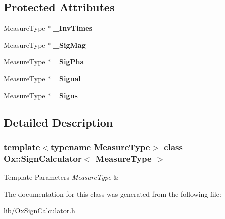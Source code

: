 \subsection*{Protected Attributes}
\begin{DoxyCompactItemize}
\item 
\mbox{\label{class_ox_1_1_sign_calculator_a13c985f9034f2b085370ce8a3c98928a}} 
Measure\+Type $\ast$ {\bfseries \+\_\+\+Inv\+Times}
\item 
\mbox{\label{class_ox_1_1_sign_calculator_adc098afb7dc3f85e517340123809ebc1}} 
Measure\+Type $\ast$ {\bfseries \+\_\+\+Sig\+Mag}
\item 
\mbox{\label{class_ox_1_1_sign_calculator_a0987cfe1a558be147bd8e12ae68e26c3}} 
Measure\+Type $\ast$ {\bfseries \+\_\+\+Sig\+Pha}
\item 
\mbox{\label{class_ox_1_1_sign_calculator_aaf53cad7c5d49133017677f8abb589bf}} 
Measure\+Type $\ast$ {\bfseries \+\_\+\+Signal}
\item 
\mbox{\label{class_ox_1_1_sign_calculator_a6dda6e1e4d83dd7ad4654f7fd2b44bb3}} 
Measure\+Type $\ast$ {\bfseries \+\_\+\+Signs}
\end{DoxyCompactItemize}


\subsection{Detailed Description}
\subsubsection*{template$<$typename Measure\+Type$>$\newline
class Ox\+::\+Sign\+Calculator$<$ Measure\+Type $>$}


\begin{DoxyTemplParams}{Template Parameters}
{\em Measure\+Type} & \\
\hline
\end{DoxyTemplParams}


The documentation for this class was generated from the following file\+:\begin{DoxyCompactItemize}
\item 
lib/\mbox{\hyperlink{_ox_sign_calculator_8h}{Ox\+Sign\+Calculator.\+h}}\end{DoxyCompactItemize}
